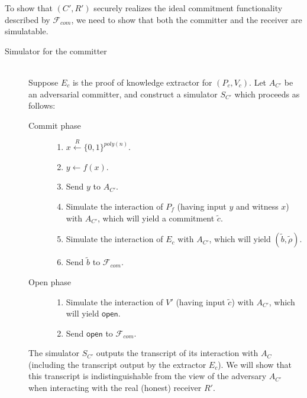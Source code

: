 \documentclass[draft]{article}
\newcommand{\getr}{\overset{R}{\gets}}
\newcommand{\getrsingle}{\getr\{0, 1\}}
\newcommand{\getrpoly}{\getrsingle^{poly(n)}}
\begin{document}
\begin{enumerate}
\begin{enumerate}
    To show that $(C', R')$ securely realizes the ideal commitment functionality described by $\mathcal{F}_{com}$, we need to show that both the committer and the receiver are simulatable.
    \begin{description}
    \item[Simulator for the committer] \hfill \\
      Suppose $E_c$ is the proof of knowledge extractor for $(P_c, V_c)$.
      Let $A_{C'}$ be an adversarial committer, and construct a simulator $S_{C'}$ which proceeds as follows:
      \begin{description}
      \item[Commit phase] \hfill
        \begin{enumerate}
        \item $x\getrpoly$.
        \item $y\gets f(x)$.
        \item Send $y$ to $A_{C'}$.
        \item Simulate the interaction of $P_f$ (having input $y$ and witness $x$) with $A_{C'}$, which will yield a commitment $\tilde{c}$.
        \item Simulate the interaction of $E_c$ with $A_{C'}$, which will yield $(\tilde{b}, \tilde{\rho})$.
        \item Send $\tilde{b}$ to $\mathcal{F}_{com}$.
        \end{enumerate}
      \item[Open phase] \hfill
        \begin{enumerate}
        \item Simulate the interaction of $V'$ (having input $\tilde{c}$) with $A_{C'}$, which will yield $\textsf{open}$.
        \item Send $\textsf{open}$ to $\mathcal{F}_{com}$.
        \end{enumerate}
      \end{description}
      The simulator $S_{C'}$ outputs the transcript of its interaction with $A_C$ (including the transcript output by the extractor $E_c$).
      We will show that this transcript is indistinguishable from the view of the adversary $A_{C'}$ when interacting with the real (honest) receiver $R'$.


\end{description}
\end{enumerate}
\end{enumerate}
\end{document}
